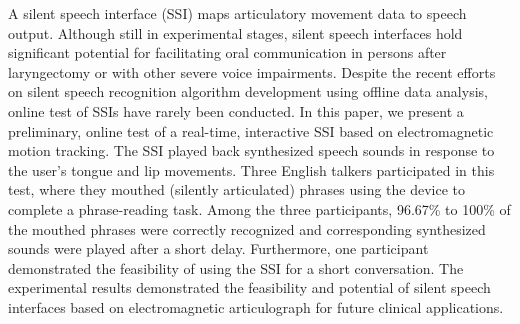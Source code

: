 A silent speech interface (SSI) maps articulatory movement data to speech output. Although still in experimental stages, silent speech interfaces hold significant potential for facilitating oral communication in persons after laryngectomy or with other severe voice impairments. Despite the recent efforts on silent speech recognition algorithm development using offline data analysis, online test of SSIs have rarely been conducted. In this paper, we present a preliminary, online test of a real-time, interactive SSI based on electromagnetic motion tracking. The SSI played back synthesized speech sounds in response to the user's tongue and lip movements. Three English talkers participated in this test, where they mouthed (silently articulated) phrases using the device to complete a phrase-reading task. Among the three participants, 96.67\% to 100\% of the mouthed phrases were correctly recognized and corresponding synthesized sounds were played after a short delay. Furthermore, one participant demonstrated the feasibility of using the SSI for a short conversation. The experimental results demonstrated the feasibility and potential of silent speech interfaces based on electromagnetic articulograph for future clinical applications.
